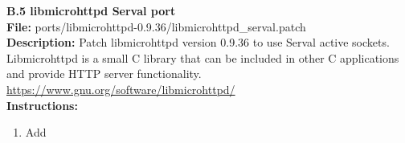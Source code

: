 \newpage
{}
{}
{\huge \bf \noindent B.5 libmicrohttpd Serval port}\\[0.5cm]
\textbf{File:} ports/libmicrohttpd-0.9.36/libmicrohttpd\_serval.patch\\
\textbf{Description:} Patch libmicrohttpd version 0.9.36 to use Serval active sockets. Libmicrohttpd is a small C library that can be included in other C applications and provide HTTP server functionality.\\
\url{https://www.gnu.org/software/libmicrohttpd/}\\
\textbf{Instructions: }
\begin{enumerate} \itemsep1pt \parskip0pt 
	\item Add\\[0.5cm]
\end{enumerate}
